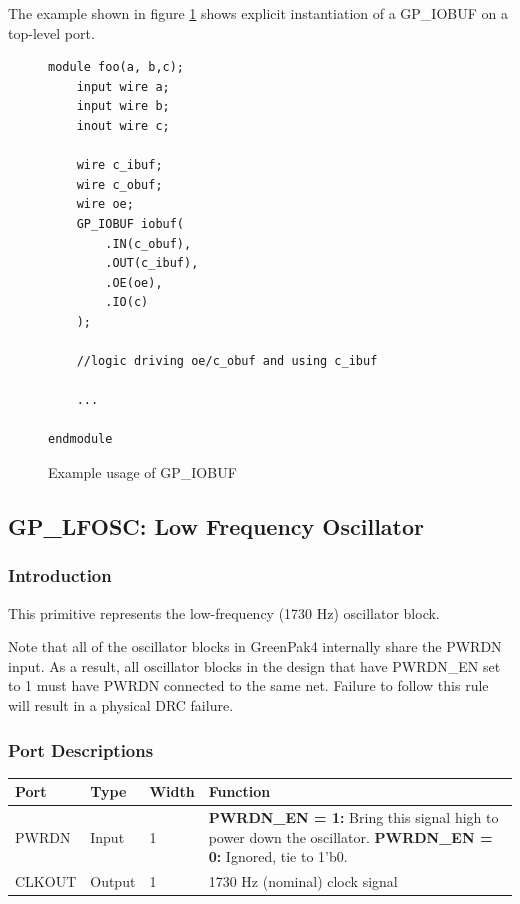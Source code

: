 \documentclass[11pt]{article}
\begin{document}
The example shown in figure \ref{gp-iobuf-example} shows explicit instantiation of a GP\_IOBUF on a top-level port.

\begin{figure}[h]
\begin{lstlisting}
module foo(a, b,c);
	input wire a;
	input wire b;
	inout wire c;
	
	wire c_ibuf;
	wire c_obuf;
	wire oe;
	GP_IOBUF iobuf(
		.IN(c_obuf),
		.OUT(c_ibuf),
		.OE(oe),
		.IO(c)
	);
	
	//logic driving oe/c_obuf and using c_ibuf
	
	...
	
endmodule
\end{lstlisting}
\caption{Example usage of GP\_IOBUF}
\label{gp-iobuf-example}
\end{figure}


\pagebreak
\subsection{GP\_LFOSC: Low Frequency Oscillator}

\subsubsection{Introduction}
This primitive represents the low-frequency (1730 Hz) oscillator block.

Note that all of the oscillator blocks in GreenPak4 internally share the PWRDN input. As a result, all oscillator 
blocks in the design that have PWRDN\_EN set to 1 must have PWRDN connected to the same net. Failure to follow this 
rule will result in a physical DRC failure.

\subsubsection{Port Descriptions}

\begin{tabularx}{5in}{|l|l|l|X|}
\hline
{\bfseries Port} & {\bfseries Type} & {\bfseries Width} & {\bfseries Function} \\
\hline
PWRDN & Input & 1 &
	{\bfseries PWRDN\_EN = 1:} \newline Bring this signal high to power down the oscillator. \newline
	{\bfseries PWRDN\_EN = 0:} \newline Ignored, tie to 1'b0.\\
\hline
CLKOUT & Output & 1 & 1730 Hz (nominal) clock signal \\
\hline
\end{tabularx}
\end{document}
